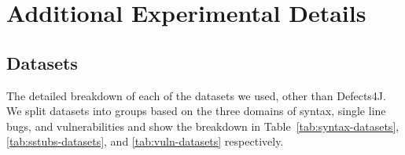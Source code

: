 \begin{comment}
\begin{table}
    \centering
    \caption{Security vulnerability bug localization MRR.}
    \label{tab:vuln-localization}
    \begin{tabular}{lrr}
    \toprule
    Method & Java1 & C\\ 
\midrule
8-shot & 0.03\phantom{$\pm$0.000} & 0.03\phantom{$\pm$0.000}  \\ 

L (Last) & 0.08$\pm$0.006 & 0.11\phantom{$\pm$0.000}  \\ 
L (Mean) & 0.06$\pm$0.004 & 0.08\phantom{$\pm$0.000}  \\ 
MM & 0.09$\pm$0.000 & 0.17\phantom{$\pm$0.000}  \\ 
NL (Last) & 0.07$\pm$0.013 & 0.09\phantom{$\pm$0.000}  \\ 
GridLoc & 0.09\phantom{$\pm$0.000} & 0.10\phantom{$\pm$0.000}  \\ 
Finetune & 0.09\phantom{$\pm$0.000} & 0.19\phantom{$\pm$0.000}  \\ 
LoRA & 0.09\phantom{$\pm$0.000} & 0.19\phantom{$\pm$0.000}  \\ 
BAP & 0.13\phantom{$\pm$0.000} & 0.16\phantom{$\pm$0.000}  \\ 
\bottomrule
    \end{tabular}
\end{table}
\end{comment}

\section{Additional Experimental Details}
\label{app:experiment-details}

\subsection{Datasets}
\label{app:datasets}

The detailed breakdown of each of the datasets we used, other than Defects4J. We split datasets into groups based on the three domains of syntax, single line bugs, and vulnerabilities and show the breakdown in Table~\ref{tab:syntax-datasets}, \ref{tab:sstubs-datasets}, and \ref{tab:vuln-datasets} respectively.

